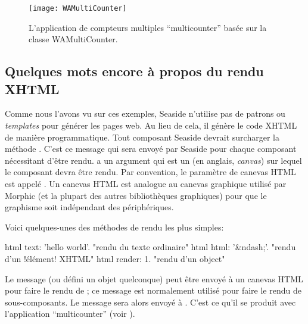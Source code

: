 \documentclass[a4paper,10pt,twoside]{book}
\begin{document}
\begin{figure}[bht]
\begin{center}
\texttt{[image: WAMultiCounter]}
\caption{L'application de compteurs multiples ``multicounter'' basée
  sur la classe WAMultiCounter.}
\end{center}
\end{figure}

\subsection{Quelques mots encore à propos du rendu XHTML}

Comme nous l'avons vu sur ces exemples, Seaside n'utilise pas de
patrons ou \emph{templates} pour générer les pages web.
Au lieu de cela, il génère le code XHTML de manière programmatique.
Tout composant Seaside devrait surcharger la méthode
 . C'est ce message qui sera
 envoyé par Seaside pour chaque composant nécessitant d'être rendu.
  a un argument qui est un
  
 (en anglais, \emph{canvas}) 
sur lequel le composant devra être rendu.
Par convention, le paramètre de canevas HTML est appelé 
 .
Un canevas HTML est analogue au canevas graphique utilisé par Morphic
(et la plupart des autres bibliothèques graphiques) pour
que le graphisme soit indépendant des périphériques.
 
Voici quelques-unes des méthodes de rendu les plus simples:
\begin{code}{}
html text: 'hello world'.  "rendu du texte ordinaire"
html html: '&ndash;'.     "rendu d'un !élément! XHTML"
html render: 1.              "rendu d'un object"
\end{code}

Le message  
(ou  défini un objet quelconque)
peut être envoyé à un canevas HTML pour faire le rendu de ; 
ce message est normalement utilisé pour faire le rendu de sous-composants.
Le message  sera alors envoyé à .
C'est ce qu'il se produit avec l'application ``multicounter''
 (voir ).
\end{document}
